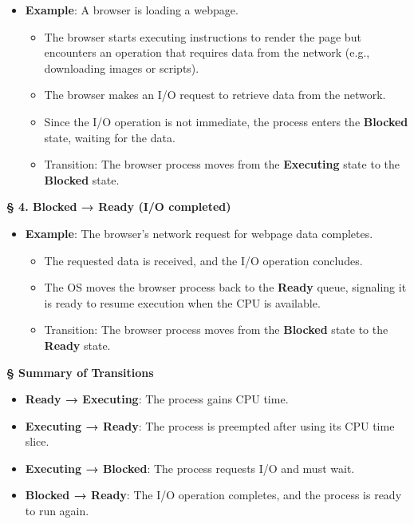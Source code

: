\documentclass[a4paper]{book}
\newcommand{\sfbf}[1]{{\normalsize\textsf{\textbf{§ #1}}}}
\begin{document}
\begin{itemize}
\item 
\textbf{Example}: A browser is loading a webpage.
\begin{itemize}
\item 
The browser starts executing instructions to render the page but encounters an operation that requires data from the network (e.g., downloading images or scripts).

\item 
The browser makes an I/O request to retrieve data from the network.

\item 
Since the I/O operation is not immediate, the process enters the \textbf{Blocked} state, waiting for the data.

\item 
Transition: The browser process moves from the \textbf{Executing} state to the \textbf{Blocked} state.

\end{itemize}

\end{itemize}

\hrulefill

\sfbf{4. Blocked → Ready (I/O completed)}

\begin{itemize}
\item 
\textbf{Example}: The browser's network request for webpage data completes.
\begin{itemize}
\item 
The requested data is received, and the I/O operation concludes.

\item 
The OS moves the browser process back to the \textbf{Ready} queue, signaling it is ready to resume execution when the CPU is available.

\item 
Transition: The browser process moves from the \textbf{Blocked} state to the \textbf{Ready} state.

\end{itemize}

\end{itemize}

\hrulefill

\sfbf{Summary of Transitions}

\begin{itemize}
\item 
\textbf{Ready → Executing}: The process gains CPU time.

\item 
\textbf{Executing → Ready}: The process is preempted after using its CPU time slice.

\item 
\textbf{Executing → Blocked}: The process requests I/O and must wait.

\item 
\textbf{Blocked → Ready}: The I/O operation completes, and the process is ready to run again.

\end{itemize}
\end{document}
